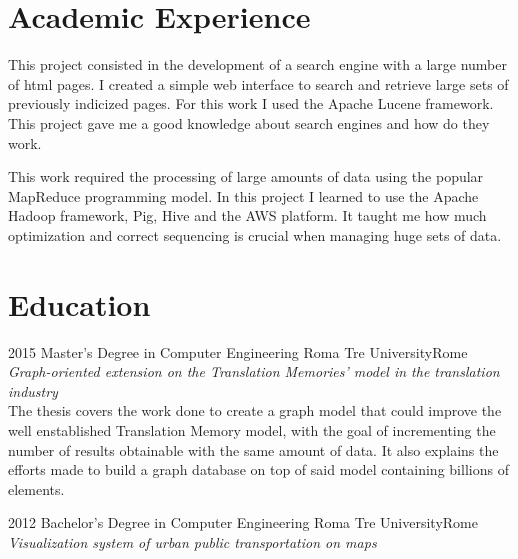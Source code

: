 \documentclass[11pt,a4paper,sans]{moderncv} %
\begin{document}
\section{Academic Experience}

{This project consisted in the development of a search engine with a large number of html pages. I created a simple web interface to search and retrieve large sets of previously indicized pages. For this work I used the Apache Lucene framework. This project gave me a good knowledge about search engines and how do they work.}


{This work required the processing of large amounts of data using the popular MapReduce programming model. In this project I learned to use the Apache Hadoop framework, Pig, Hive and the AWS platform. It taught me how much optimization and correct sequencing is crucial when managing huge sets of data.}


\section{Education}

\cventry
{2015}
{Master's Degree in Computer Engineering}
{Roma Tre University}{Rome}
{}
{\emph{\normalsize {Graph-oriented extension on the Translation Memories' model in the translation industry}}\\
The thesis covers the work done to create a graph model that could improve the well enstablished Translation Memory model, with the goal of incrementing the number of results obtainable with the same amount of data. It also explains the efforts made to build a graph database on top of said model containing billions of elements.}

\cventry
{2012}
{Bachelor's Degree in Computer Engineering}
{Roma Tre University}{Rome}
{}
{\emph{\normalsize {Visualization system of urban public transportation on maps}}}


\newpage
\end{document}
